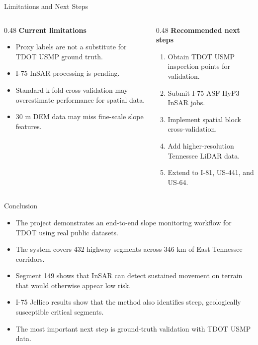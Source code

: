 \documentclass[aspectratio=169,11pt]{beamer}
\newcommand{\slideheading}[1]{\vspace{0.05cm}\textbf{#1}\vspace{0.12cm}}
\begin{document}
\begin{frame}{Limitations and Next Steps}
\begin{columns}[T,onlytextwidth]
\begin{column}{0.48\textwidth}
\slideheading{Current limitations}
\begin{itemize}\setlength\itemsep{0.3em}\small
  \item Proxy labels are not a substitute for TDOT USMP ground truth.
  \item I-75 InSAR processing is pending.
  \item Standard k-fold cross-validation may overestimate performance for spatial data.
  \item 30 m DEM data may miss fine-scale slope features.
\end{itemize}
\end{column}
\begin{column}{0.48\textwidth}
\slideheading{Recommended next steps}
\begin{enumerate}\setlength\itemsep{0.3em}\small
  \item Obtain TDOT USMP inspection points for validation.
  \item Submit I-75 ASF HyP3 InSAR jobs.
  \item Implement spatial block cross-validation.
  \item Add higher-resolution Tennessee LiDAR data.
  \item Extend to I-81, US-441, and US-64.
\end{enumerate}
\end{column}
\end{columns}
\end{frame}

\begin{frame}{Conclusion}
\begin{itemize}\setlength\itemsep{0.45em}
  \item The project demonstrates an end-to-end slope monitoring workflow for TDOT using real public datasets.
  \item The system covers 432 highway segments across 346 km of East Tennessee corridors.
  \item Segment 149 shows that InSAR can detect sustained movement on terrain that would otherwise appear low risk.
  \item I-75 Jellico results show that the method also identifies steep, geologically susceptible critical segments.
  \item The most important next step is ground-truth validation with TDOT USMP data.
\end{itemize}
\vspace{0.35cm}
\begin{center}
\end{center}
\end{frame}
\end{document}
